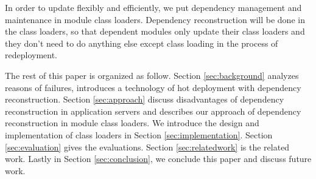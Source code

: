 \documentclass[conference]{IEEEtran}
\begin{document}






In order to update flexibly and efficiently, we put dependency management and maintenance in module class loaders.
Dependency reconstruction will be done in the class loaders, so that dependent modules only update their class loaders and they don't need to do anything else except class loading in the process of redeployment.

The rest of this paper is organized as follow. 
Section \ref{sec:background} analyzes reasons of failures, introduces a technology of hot deployment with dependency reconstruction. 
Section \ref{sec:approach} discuss disadvantages of dependency reconstruction in application servers and describes our approach of dependency reconstruction in module class loaders.
We introduce the design and implementation of class loaders in Section \ref{sec:implementation}.
Section \ref{sec:evaluation} gives the evaluations.
Section \ref{sec:relatedwork} is the related work.
Lastly in Section \ref{sec:conclusion}, we conclude this paper and discuss future work.
\end{document}
